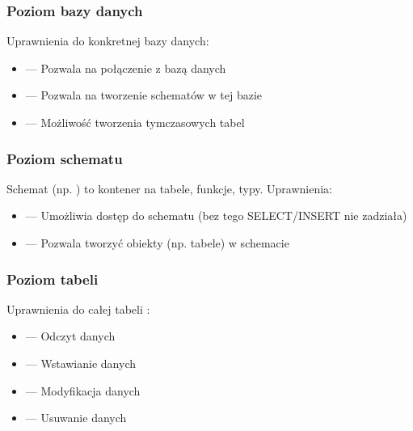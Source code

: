 \documentclass[a4paper,11pt,openany,english]{sphinxmanual}
\begin{document}
\subsubsection{Poziom bazy danych}
\label{\detokenize{rozdzial2/Bezpieczenstwo/index:poziom-bazy-danych}}
\sphinxAtStartPar
Uprawnienia do konkretnej bazy danych:
\begin{itemize}
\item {} 
\sphinxAtStartPar
{} — Pozwala na połączenie z bazą danych

\item {} 
\sphinxAtStartPar
{} — Pozwala na tworzenie schematów w tej bazie

\item {} 
\sphinxAtStartPar
{} — Możliwość tworzenia tymczasowych tabel

\end{itemize}


\subsubsection{Poziom schematu}
\label{\detokenize{rozdzial2/Bezpieczenstwo/index:poziom-schematu}}
\sphinxAtStartPar
Schemat (np. ) to kontener na tabele, funkcje, typy. Uprawnienia:
\begin{itemize}
\item {} 
\sphinxAtStartPar
{} — Umożliwia dostęp do schematu (bez tego SELECT/INSERT nie zadziała)

\item {} 
\sphinxAtStartPar
{} — Pozwala tworzyć obiekty (np. tabele) w schemacie

\end{itemize}


\subsubsection{Poziom tabeli}
\label{\detokenize{rozdzial2/Bezpieczenstwo/index:poziom-tabeli}}
\sphinxAtStartPar
Uprawnienia do całej tabeli :
\begin{itemize}
\item {} 
\sphinxAtStartPar
{} — Odczyt danych

\item {} 
\sphinxAtStartPar
{} — Wstawianie danych

\item {} 
\sphinxAtStartPar
{} — Modyfikacja danych

\item {} 
\sphinxAtStartPar
{} — Usuwanie danych

\end{itemize}
\end{document}
